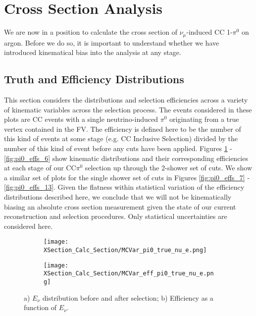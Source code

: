 \clearpage
\section{Cross Section Analysis}
\par We are now in a position to calculate the cross section of $\nu_\mu$-induced CC 1-$\pi^0$ on argon.  Before we do so, it is important to understand whether we have introduced kinematical bias into the analysis at any stage.  

\subsection{Truth and Efficiency Distributions}
This section considers the distributions and selection efficiencies across a variety of kinematic variables across the selection process.  The events considered in these plots are CC events with a single neutrino-induced $\pi^0$ originating from a true vertex contained in the FV. The efficiency is defined here to be the number of this kind of events at some stage (e.g. CC Inclusive Selection) divided by the number of this kind of event before any cuts have been applied.  Figures \ref{fig:pi0_effs_0} - \ref{fig:pi0_effs_6} show kinematic distributions and their corresponding efficiencies at each stage of our CC$\pi^0$ selection up through the 2-shower set of cuts.  We show a similar set of plots for the single shower set of cuts in Figures \ref{fig:pi0_effs_7} - \ref{fig:pi0_effs_13}. Given the flatness within statistical variation of the efficiency distributions described here, we conclude that we will not be kinematically biasing an absolute cross section measurement given the state of our current reconstruction and selection procedures. Only statistical uncertainties are considered here. 

\begin{figure}[h!]

 \begin{subfigure}[t]{0.39\textwidth}
    \texttt{[image: XSection\_Calc\_Section/MCVar\_pi0\_true\_nu\_e.png]}
  \caption{ }
  \end{subfigure} 
  \hspace{15mm}
  \begin{subfigure}[t]{0.39\textwidth}
\texttt{[image: XSection\_Calc\_Section/MCVar\_eff\_pi0\_true\_nu\_e.png]}
  \caption{ }
  \end{subfigure} 
\caption{a) $E_\nu$ distribution before and after selection; b) Efficiency as a function of $E_\nu$. }
\label{fig:pi0_effs_0}
\end{figure}

